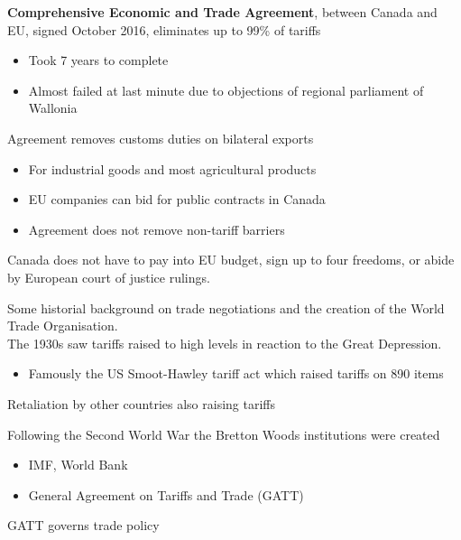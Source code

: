 \documentclass{beamer}
\begin{document}
\begin{frame}
\textbf{Comprehensive Economic and Trade Agreement}, between Canada and EU, signed October 2016, eliminates up to 99\% of tariffs
\begin{itemize}
  \item Took 7 years to complete
  \item Almost failed at last minute due to objections of regional parliament of Wallonia
\end{itemize}
\medskip
Agreement removes customs duties on bilateral exports
\begin{itemize}
  \item For industrial goods and most agricultural products
  \item EU companies can bid for public contracts in Canada
  \item Agreement does not remove non-tariff barriers
\end{itemize}
\medskip
Canada does not have to pay into EU budget, sign up to four freedoms, or abide by European court of justice rulings.
\end{frame}

\begin{frame}
 Some historial background on trade negotiations and the creation of the World Trade Organisation.\\ 
 The 1930s saw tariffs raised to high levels in reaction to the Great Depression.  
 \begin{itemize}
   \item Famously the US Smoot-Hawley tariff act which raised tariffs on 890 items
 \end{itemize}
 \medskip 
 Retaliation by other countries also raising tariffs
\end{frame}

\begin{frame}
Following the Second World War the Bretton Woods institutions were created
\begin{itemize}
  \item IMF, World Bank
  \item General Agreement on Tariffs and Trade (GATT)
\end{itemize}
\medskip
GATT governs trade policy
\end{frame}
\end{document}
